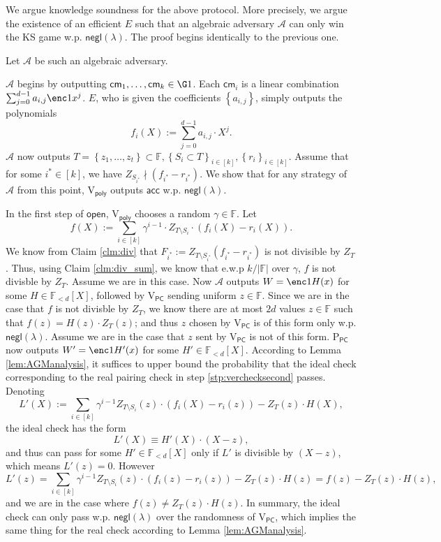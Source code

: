 \documentclass[11pt]{article} %
\newcommand{\F}{\ensuremath{\mathbb F}\xspace}
\newcommand{\adv}{\ensuremath{\mathcal A}\xspace}
\newcommand{\cm}{\ensuremath{\mathsf{cm}}\xspace}
\newcommand{\open}{\ensuremath{\mathsf{open}}\xspace}
\newcommand{\negl}{\ensuremath{\mathsf{negl}(\lambda)}\xspace}
\newcommand{\acc}{\ensuremath{\mathsf{acc}}\xspace}
\newcommand{\defeq}{:=}
\newcommand{\sett}[2]{\ensuremath{\set{#1}_{#2}}\xspace}
\newcommand{\prvpc}{\ensuremath{\mathrm{P_{\mathsf{PC}}}}\xspace}
\newcommand{\verpoly}{\ensuremath{\mathrm{V_{\mathsf{poly}}}}\xspace}
\newcommand{\verpc}{\ensuremath{\mathrm{V_{\mathsf{PC}}}}\xspace}
\newcommand{\ext}{\ensuremath{E}\xspace}
\newcommand{\set}[1]{\ensuremath{\left\{#1\right\}}\xspace}
\newcommand{\polysofdeg}[1]{\ensuremath{\F_{< #1}[X]}\xspace}
\begin{document}
    
    



We argue knowledge soundness for the above protocol. More precisely, we argue the existence of an efficient \ext such that an algebraic adversary \adv can only win the KS game w.p. \negl.  The proof begins identically to the previous one.


 Let \adv be such an algebraic adversary.

 \adv begins by outputting $\cm_1,\ldots,\cm_k\in \G1$.
 Each $\cm_i$ is a linear combination $\sum_{j=0}^{d-1} a_{i,j} \enc1{x^j}$.
 \ext, who is given the coefficients \set{a_{i,j}}, simply outputs the polynomials
 \[f_i(X)\defeq \sum_{j=0}^{d-1} a_{i,j} \cdot X^j.\]
 \adv now outputs $T=\set{z_1,\ldots,z_t}\subset \F,\sett{S_i\subset T}{i\in [k]},\sett{r_{i}}{i\in [k]}$.
  Assume that for some $i^*\in [k]$, we have $Z_{S_{i^*}}\nmid (f_{i^*}-r_{i^*})$. We show that for any strategy of \adv from this point, \verpoly outputs \acc w.p. \negl.

 In the first step of \open, \verpoly chooses a random $\gamma \in \F$.
 Let
 \[f(X)\defeq \sum_{i\in [k]} \gamma^{i-1} \cdot Z_{T\setminus S_i}\cdot (f_i(X)-r_i(X)).\]
 We know from Claim \ref{clm:div} that $F_{i^*} \defeq  Z_{T\setminus S_{i^*}} (f_{i^*}-r_{i^*})$ is not divisible by $Z_T$. Thus, using Claim \ref{clm:div_sum}, we know that e.w.p $k/|\F|$ over $\gamma$, $f$ is not divisble by $Z_T$. Assume we are in this case.  Now \adv outputs $W=\enc1{H(x)}$ for some $H\in\polysofdeg{d}$, followed by \verpc sending uniform $z\in \F$.
 Since we are in the case that $f$ is not divisble by $Z_T$, we know there are at most
 $2d$ values $z\in \F$ such that $f(z) = H(z)\cdot Z_T(z)$; and thus $z$ chosen by \verpc is of this form only w.p. \negl. Assume we are in the case that $z$ sent by \verpc is not of this form.
  \prvpc now outputs $W'=\enc1{H'(x)}$ for some $H'\in \polysofdeg{d}$.
 According to Lemma \ref{lem:AGManalysis}, it suffices to upper bound the probability that the ideal check corresponding to the real pairing check in step \ref{stp:verchecksecond} passes.
 Denoting
 \[L'(X)\defeq \sum_{i\in [k]}\gamma^{i-1} Z_{T\setminus S_i}(z)\cdot (f_i(X) - r_i(z)) - Z_T(z)\cdot H(X),\]
 the ideal check has the form
 \[L'(X)\equiv H'(X)\cdot (X-z),\]
 and thus can pass for some $H'\in \polysofdeg{d}$ only if $L'$ is divisible by $(X-z)$, which means $L'(z)=0$.
 However
 \[L'(z) = \sum_{i\in [k]}\gamma^{i-1} Z_{T\setminus S_i}(z)\cdot (f_i(z) - r_i(z)) - Z_T(z)\cdot H(z)=
  f(z)-Z_T(z)\cdot H(z),
 \]
and we are in the case where $f(z)\neq Z_T(z)\cdot H(z)$.
 In summary, the ideal check can only pass w.p. $\negl$ over the randomness of \verpc, which implies the same thing for the real check according to Lemma \ref{lem:AGManalysis}.
\end{document}
